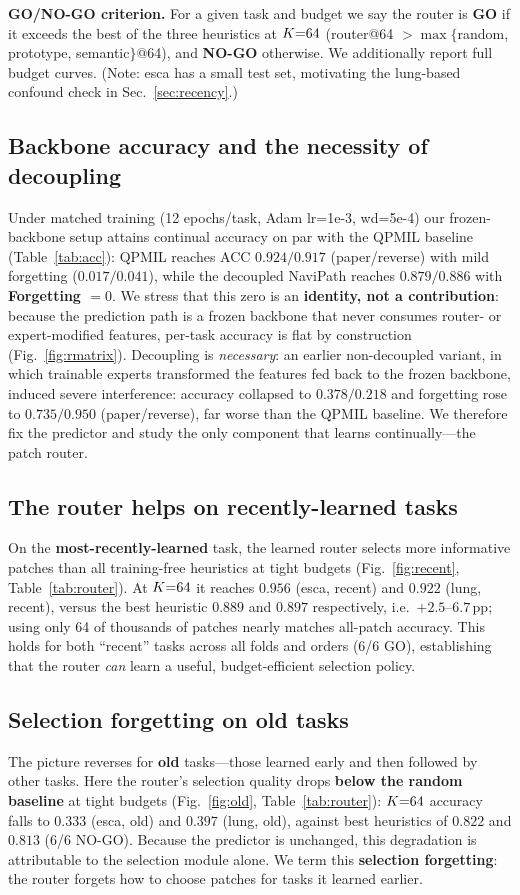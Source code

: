 \noindent\textbf{GO/NO-GO criterion.} For a given task and budget we say the
router is \textbf{GO} if it exceeds the best of the three heuristics at $K{=}64$
(router@64 $>\max\{$random, prototype, semantic$\}$@64), and \textbf{NO-GO}
otherwise. We additionally report full budget curves. (Note: esca has a small
test set, motivating the lung-based confound check in Sec.~\ref{sec:recency}.)

\subsection{Backbone accuracy and the necessity of decoupling}
Under matched training (12 epochs/task, Adam lr=1e-3, wd=5e-4) our
frozen-backbone setup attains continual accuracy on par with the QPMIL baseline
(Table~\ref{tab:acc}): QPMIL reaches ACC $0.924/0.917$ (paper/reverse) with mild
forgetting ($0.017/0.041$), while the decoupled NaviPath reaches $0.879/0.886$
with \textbf{Forgetting $=0$}. We stress that this zero is an \textbf{identity,
not a contribution}: because the prediction path is a frozen backbone that never
consumes router- or expert-modified features, per-task accuracy is flat by
construction (Fig.~\ref{fig:rmatrix}). Decoupling is \emph{necessary}: an
earlier non-decoupled variant, in which trainable experts transformed the
features fed back to the frozen backbone, induced severe interference: accuracy
collapsed to $0.378/0.218$ and forgetting rose to $0.735/0.950$ (paper/reverse),
far worse than the QPMIL baseline. We therefore fix the predictor and study the
only component that learns continually---the patch router.

\subsection{The router helps on recently-learned tasks}
On the \textbf{most-recently-learned} task, the learned router selects more
informative patches than all training-free heuristics at tight budgets
(Fig.~\ref{fig:recent}, Table~\ref{tab:router}). At $K{=}64$ it reaches $0.956$
(esca, recent) and $0.922$ (lung, recent), versus the best heuristic $0.889$ and
$0.897$ respectively, i.e.\ $+2.5$--$6.7$\,pp; using only 64 of thousands of
patches nearly matches all-patch accuracy. This holds for both ``recent'' tasks
across all folds and orders (6/6 GO), establishing that the router \emph{can}
learn a useful, budget-efficient selection policy.

\subsection{Selection forgetting on old tasks}
The picture reverses for \textbf{old} tasks---those learned early and then
followed by other tasks. Here the router's selection quality drops \textbf{below
the random baseline} at tight budgets (Fig.~\ref{fig:old},
Table~\ref{tab:router}): $K{=}64$ accuracy falls to $0.333$ (esca, old) and
$0.397$ (lung, old), against best heuristics of $0.822$ and $0.813$ (6/6
NO-GO). Because the predictor is unchanged, this degradation is attributable to
the selection module alone. We term this \textbf{selection forgetting}: the
router forgets how to choose patches for tasks it learned earlier.

